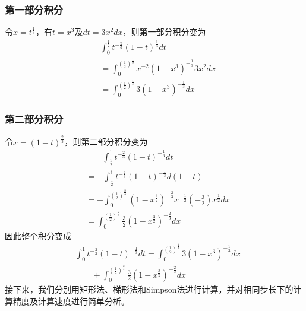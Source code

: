 \documentclass[twoside,twocolumn]{article}
\begin{document}
\begin{CJK*}{UTF8}{gkai}
\subsubsection{第一部分积分}
令$x=t^{\frac{1}{3}}$，有$t=x^{3}$及$dt=3x^{2}dx$，则第一部分积分变为
\begin{equation*}
	\begin{aligned}
		&\int_{0}^{\frac{1}{2}}t^{-\frac{2}{3}}(1-t)^{\frac{1}{3}}dt\\
		&=\int_{0}^{(\frac{1}{2})^{\frac{1}{3}}}x^{-2}(1-x^{3})^{-\frac{1}{3}}3x^{2}dx\\
		&=\int_{0}^{(\frac{1}{2})^{\frac{1}{3}}}3(1-x^{3})^{-\frac{1}{3}}dx
	\end{aligned}
\end{equation*}
\subsubsection{第二部分积分}
令$x=(1-t)^{\frac{2}{3}}$，则第二部分积分变为
\begin{equation*}
	\begin{aligned}
		&\qquad \int_{\frac{1}{2}}^{1}t^{-\frac{2}{3}}(1-t)^{-\frac{1}{3}}dt\\
		&=-\int_{\frac{1}{2}}^{1}t^{-\frac{2}{3}}(1-t)^{-\frac{1}{3}}d(1-t)\\
		&=-\int_{0}^{\left(\frac{1}{2}\right)^{\frac{2}{3}}}(1-x^{\frac{3}{2}})^{-\frac{2}{3}}x^{-\frac{1}{2}}(-\frac{3}{2})x^{\frac{1}{2}}dx\\
		&=\int_{0}^{\left(\frac{1}{2}\right)^{\frac{2}{3}}}\frac{3}{2}(1-x^{\frac{3}{2}})^{-\frac{2}{3}}dx
	\end{aligned}
\end{equation*}
因此整个积分变成
\begin{equation*}
	\begin{aligned}
		&\int_{0}^{1}t^{-\frac{2}{3}}(1-t)^{-\frac{1}{3}}dt=\int_{0}^{(\frac{1}{2})^{\frac{1}{3}}}3(1-x^{3})^{-\frac{1}{3}}dx\\
		&\qquad +\int_{0}^{\left(\frac{1}{2}\right)^{\frac{2}{3}}}\frac{3}{2}\left(1-x^{\frac{3}{2}}\right)^{-\frac{2}{3}}dx
	\end{aligned}
\end{equation*}
接下来，我们分别用矩形法、梯形法和Simpson法进行计算，并对相同步长下的计算精度及计算速度进行简单分析。

\end{CJK*}
\end{document}
